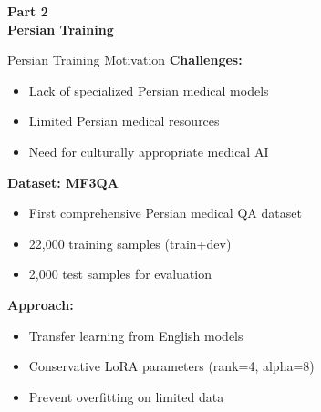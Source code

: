 \begin{frame}[plain]
    \begin{center}
        \Large{\textbf{Part 2}}\\
        \vspace{0.5em}
        \huge{\textbf{Persian Training}}\\
    \end{center}
\end{frame}

\begin{frame}{Persian Training Motivation}
    \textbf{Challenges:}
    \begin{itemize}
        \item Lack of specialized Persian medical models
        \item Limited Persian medical resources
        \item Need for culturally appropriate medical AI
    \end{itemize}
    
    \vspace{0.5em}
    
    \textbf{Dataset: MF3QA}
    \begin{itemize}
        \item First comprehensive Persian medical QA dataset
        \item 22,000 training samples (train+dev)
        \item 2,000 test samples for evaluation
    \end{itemize}
    
    \vspace{0.5em}
    
    \textbf{Approach:}
    \begin{itemize}
        \item Transfer learning from English models
        \item Conservative LoRA parameters (rank=4, alpha=8)
        \item Prevent overfitting on limited data
    \end{itemize}
\end{frame}

